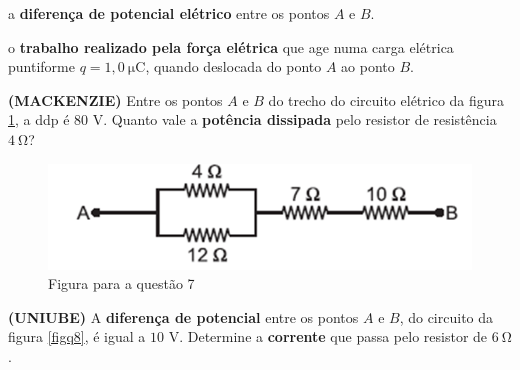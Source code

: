 \documentclass{yagoexam}
\begin{document}
\begin{questions}
\begin{parts}
			\item a \textbf{diferença de potencial elétrico} entre os pontos $A$ e $B$.
			\vspace{4cm}
			
			\item o \textbf{trabalho realizado pela força elétrica} que age numa carga elétrica puntiforme $q = 1,0 \ \si{\micro}$C, quando deslocada do ponto $A$ ao ponto $B$.
			
		\end{parts}
		
		\newpage
		
		\question[10]
		\textbf{(MACKENZIE)} Entre os pontos $A$ e $B$ do trecho do circuito elétrico da figura \ref{figq7}, a ddp é $80$ V. Quanto vale a \textbf{potência dissipada} pelo resistor de resistência $4 \ \si{\ohm}$?
		
		\begin{figure}[H]
			\label{figq7}
			\caption{Figura para a questão 7}
			\begin{center}
				\includegraphics[scale=1]{imgs/q7.PNG}
			\end{center}
		\end{figure} 
		
		\vspace{3cm}
		
		\question[10]
		
		\textbf{(UNIUBE)} A \textbf{diferença de potencial} entre os pontos $A$ e $B$, do circuito da figura \ref{figq8}, é igual a $10$ V. Determine a \textbf{corrente} que passa pelo resistor de $6 \ \si{\ohm}$.
		

\end{questions}
\end{document}
